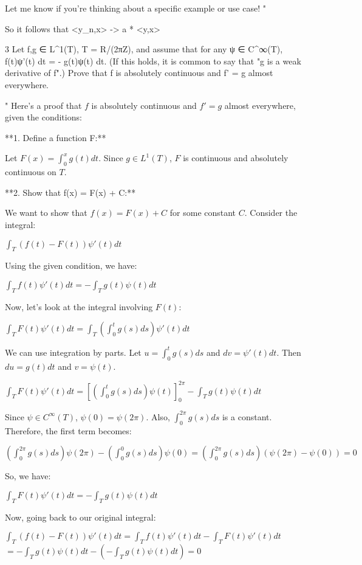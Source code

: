Let me know if you're thinking about a specific example or use case!
"

So it follows that <y_n,x> -> a * <y,x>

3 Let f,g ∈ L^1(T), T = R/(2πZ), and assume that for any ψ ∈ C^∞(T), \int f(t)ψ'(t) dt = - \int g(t)ψ(t) dt. (If this holds, it is common to say that "g is a weak derivative of f".) Prove that f is absolutely continuous and f' = g almost everywhere.

"
Here's a proof that $f$ is absolutely continuous and $f' = g$ almost everywhere, given the conditions:

**1. Define a function F:**

Let $F(x) = \int_0^x g(t) dt$. Since $g \in L^1(T)$, $F$ is continuous and absolutely continuous on $T$.

**2. Show that f(x) = F(x) + C:**

We want to show that $f(x) = F(x) + C$ for some constant $C$. Consider the integral:

$\int_T (f(t) - F(t)) \psi'(t) dt$

Using the given condition, we have:

$\int_T f(t) \psi'(t) dt = - \int_T g(t) \psi(t) dt$

Now, let's look at the integral involving $F(t)$:

$\int_T F(t) \psi'(t) dt = \int_T \left( \int_0^t g(s) ds \right) \psi'(t) dt$

We can use integration by parts. Let $u = \int_0^t g(s) ds$ and $dv = \psi'(t) dt$. Then $du = g(t) dt$ and $v = \psi(t)$.

$\int_T F(t) \psi'(t) dt = \left[ \left( \int_0^t g(s) ds \right) \psi(t) \right]_0^{2\pi} - \int_T g(t) \psi(t) dt$

Since $\psi \in C^\infty(T)$, $\psi(0) = \psi(2\pi)$. Also, $\int_0^{2\pi} g(s) ds$ is a constant. Therefore, the first term becomes:

$\left( \int_0^{2\pi} g(s) ds \right) \psi(2\pi) - \left( \int_0^0 g(s) ds \right) \psi(0) = \left( \int_0^{2\pi} g(s) ds \right) (\psi(2\pi) - \psi(0)) = 0$

So, we have:

$\int_T F(t) \psi'(t) dt = - \int_T g(t) \psi(t) dt$

Now, going back to our original integral:

$\int_T (f(t) - F(t)) \psi'(t) dt = \int_T f(t) \psi'(t) dt - \int_T F(t) \psi'(t) dt$
$= - \int_T g(t) \psi(t) dt - (- \int_T g(t) \psi(t) dt) = 0$

